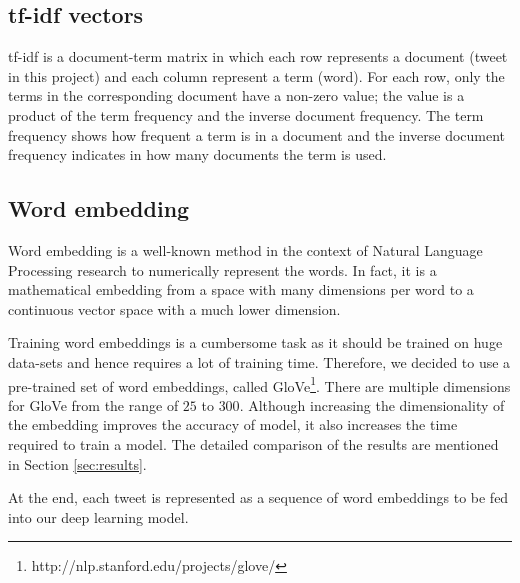 \documentclass[8pt,conference,compsocconf]{IEEEtran}
\begin{document}
\subsection{tf-idf vectors}
tf-idf is a document-term matrix in which each row represents a document (tweet in this project) and each column represent a term (word). For each row, only the terms in the corresponding document have a non-zero value; the value is a product of the term frequency and the inverse document frequency. The term frequency shows how frequent a term is in a document and the inverse document frequency indicates in how many documents the term is used.
\subsection{Word embedding}
Word embedding is a well-known method in the context of Natural Language Processing research to numerically represent the words. In fact, it is a mathematical embedding from a space with many dimensions per word to a continuous vector space with a much lower dimension. 

Training word embeddings is a cumbersome task as it should be trained on huge data-sets and hence requires a lot of training time. Therefore, we decided to use a pre-trained set of word embeddings, called GloVe\footnote{http://nlp.stanford.edu/projects/glove/}. There are multiple dimensions for GloVe from the range of $25$ to $300$. Although increasing the dimensionality of the embedding improves the accuracy of model, it also increases the time required to train a model.
The detailed comparison of the results are mentioned in Section \ref{sec:results}.

At the end, each tweet is represented as a sequence of word embeddings to be fed into our deep learning model.

\end{document}
